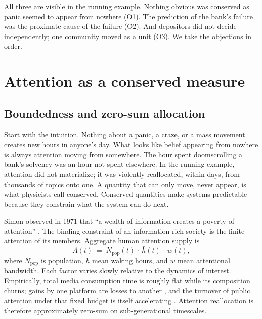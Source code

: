 \documentclass[11pt]{article}
\begin{document}
All three are visible in the running example. Nothing obvious was conserved as panic seemed to appear from nowhere (O1). The prediction of the bank's failure was the proximate cause of the failure (O2). And depositors did not decide independently; one community moved as a unit (O3). We take the objections in order.

\section{Attention as a conserved measure}
\label{sec:attention}

\subsection{Boundedness and zero-sum allocation}

Start with the intuition. Nothing about a panic, a craze, or a mass movement creates new hours in anyone's day. What looks like belief appearing from nowhere is always attention moving from somewhere. The hour spent doomscrolling a bank's solvency was an hour not spent elsewhere. In the running example, attention did not materialize; it was violently reallocated, within days, from thousands of topics onto one. A quantity that can only move, never appear, is what physicists call conserved. Conserved quantities make systems predictable because they constrain what the system can do next.

Simon observed in 1971 that ``a wealth of information creates a poverty of attention'' \cite{simon1971}. The binding constraint of an information-rich society is the finite attention of its members. Aggregate human attention supply is
\begin{equation}
A(t) \;=\; N_{\mathrm{pop}}(t)\,\cdot\, \bar h(t) \,\cdot\, \bar w(t),
\end{equation}
where $N_{\mathrm{pop}}$ is population, $\bar h$ mean waking hours, and $\bar w$ mean attentional bandwidth. Each factor varies slowly relative to the dynamics of interest. Empirically, total media consumption time is roughly flat while its composition churns; gains by one platform are losses to another \cite{wu2008}, and the turnover of public attention under that fixed budget is itself accelerating \cite{lorenzspreen2019}. Attention reallocation is therefore approximately zero-sum on sub-generational timescales.
\end{document}
